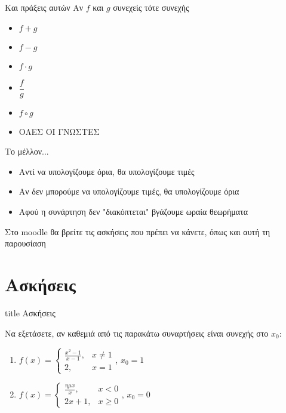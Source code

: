 \documentclass{presentation}
\begin{document}
\begin{frame}{Και πράξεις αυτών}
  Αν $f$ και $g$ συνεχείς τότε συνεχής
  \begin{itemize}[<+->]
    \item $f+g$
    \item $f-g$
    \item $f\cdot g$
    \item $\dfrac{f}{g}$
    \item $f\circ g$
    \item ΟΛΕΣ ΟΙ ΓΝΩΣΤΕΣ
  \end{itemize}
\end{frame}

\begin{frame}{Το μέλλον...}
  \begin{itemize}[<+->]
    \item Αντί να υπολογίζουμε όρια, θα υπολογίζουμε τιμές
    \item Αν δεν μπορούμε να υπολογίζουμε τιμές, θα υπολογίζουμε όρια
    \item Αφού η συνάρτηση δεν "διακόπτεται" βγάζουμε ωραία θεωρήματα
  \end{itemize}
\end{frame}

\begin{frame}[noframenumbering]
  Στο moodle θα βρείτε τις ασκήσεις που πρέπει να κάνετε, όπως και αυτή τη παρουσίαση
\end{frame}

\section{Ασκήσεις}

\begin{frame}[noframenumbering]
  \vfill
  \centering
  \begin{beamercolorbox}[sep=8pt,center,shadow=true,rounded=true]{title}
    Ασκήσεις
  \end{beamercolorbox}
  \vfill
\end{frame}

\begin{askisi}
  Να εξετάσετε, αν καθεμιά από τις παρακάτω συναρτήσεις είναι συνεχής στο $x_0$:
  \begin{enumerate}[<+->]
    \item $f(x)=\begin{cases}
              \frac{x^2-1}{x-1}, & x\ne 1 \\
              2,                 & x=1
            \end{cases}$, $x_0=1$
    \item $f(x)=\begin{cases}
              \frac{ημx}{x}, & x<0    \\
              2x+1,          & x\ge 0
            \end{cases}$, $x_0=0$
  \end{enumerate}

\end{askisi}
\end{document}
